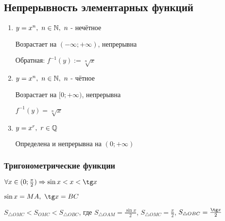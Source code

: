 \subsection{Непрерывность элементарных функций}

\begin{enumerate}
	\item $y = x^n,\ n \in \mathbb{N},\ n$ - нечётное
	
	Возрастает на $(-\infty; +\infty)$, непрерывна
	
	Обратная: $f^{-1}(y) := \sqrt[n]{x}$
	
	\item $y = x^n,\ n \in \mathbb{N},\ n$ - чётное
	
	Возрастает на $[0; +\infty)$, непрерывна
	
	$f^{-1}(y) = \sqrt[n]{x}$
	
	\item $y = x^r,\ r \in \mathbb{Q}$
	
	Определена и непрерывна на $(0; +\infty)$
\end{enumerate}

\subsubsection*{Тригонометрические функции}

\begin{lemma} \label{for_trig}
	$\forall x \in (0; \frac{\pi}{2}) \Ra \sin x < x < \tg x$
	
	$\sin x = MA,\ \tg x = BC$
	
	$S_{\triangle OMC} < S_{OMC} < S_{\triangle OBC}$, где $S_{\triangle OAM} = \frac{\sin x}{2}$, $S_{\triangle OMC} = \frac{x}{2}$, $S_{\triangle OBC} = \frac{\tg x}{2}$
\end{lemma}